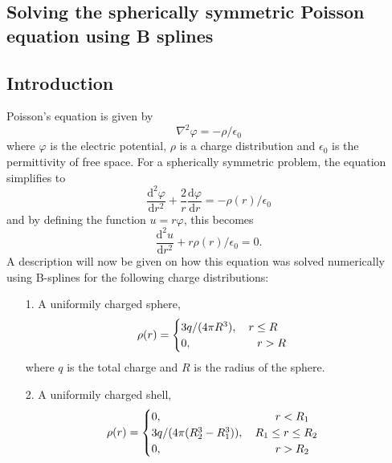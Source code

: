 \documentclass[twocolumn]{article}
\begin{document}
\begin{large}
\section*{Solving the spherically symmetric Poisson equation using B splines}
\subsection*{Introduction}
Poisson's equation is given by
\begin{equation}
    \nabla^2\varphi = -\rho/\epsilon_0
\end{equation}
where $\varphi$ is the electric potential, $\rho$ is a charge distribution and $\epsilon_0$ is the permittivity of free space. For a spherically symmetric problem, the equation simplifies to
\begin{equation}
    \frac{\text{d}^2\varphi}{\text{d}r^2}+\frac{2}{r}\frac{\text{d}\varphi}{\text{d}r} = -\rho(r)/\epsilon_0
\end{equation}
and by defining the function $u=r\varphi$, this becomes
\begin{equation}
    \label{12apr1845}
    \frac{\text{d}^2u}{\text{d}r^2} + r\rho(r)/\epsilon_0 = 0.
\end{equation}
A description will now be given on how this equation was solved numerically using B-splines for the following charge distributions:
\begin{itemize}
    \item[1.] A uniformily charged sphere, 
    \begin{equation}
        \rho(r) = 
        \begin{cases}
            3q/(4\pi R^3),\quad r\leq R \\ 
            0,\hspace{1.7cm}\quad r>R
        \end{cases}
    \end{equation}
    where $q$ is the total charge and $R$ is the radius of the sphere.
    \item[2.] A uniformily charged shell,
    \begin{equation}
        \rho(r) = 
        \begin{cases}
            0,\hspace{3.2cm}\quad r<R_1  \\ 
            3q/(4\pi (R_2^3-R_1^3)),\quad R_1\leq r\leq R_2 \\ 
            0,\hspace{3.2cm}\quad r>R_2

\end{cases}
\end{equation}
\end{itemize}
\end{large}
\end{document}
